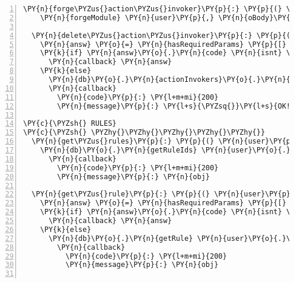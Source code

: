 \begin{Verbatim}[fontsize=\scriptsize,commandchars=\\\{\},numbers=left,firstnumber=1,stepnumber=1]
  \PY{n}{forge\PYZus{}action\PYZus{}invoker}\PY{p}{:} \PY{p}{(} \PY{n}{user}\PY{p}{,} \PY{n}{oBody}\PY{p}{,} \PY{n}{callback} \PY{p}{)} \PY{o}{\PYZhy{}}\PY{o}{\PYZgt{}}
    \PY{n}{forgeModule} \PY{n}{user}\PY{p}{,} \PY{n}{oBody}\PY{p}{,} \PY{l+s}{\PYZdq{}}\PY{l+s}{actioninvoker}\PY{l+s}{\PYZdq{}}\PY{p}{,} \PY{n}{db}\PY{o}{.}\PY{n}{actionInvokers}\PY{p}{,} \PY{n}{callback}

  \PY{n}{delete\PYZus{}action\PYZus{}invoker}\PY{p}{:} \PY{p}{(} \PY{n}{user}\PY{p}{,} \PY{n}{oBody}\PY{p}{,} \PY{n}{callback} \PY{p}{)} \PY{o}{\PYZhy{}}\PY{o}{\PYZgt{}}
    \PY{n}{answ} \PY{o}{=} \PY{n}{hasRequiredParams} \PY{p}{[} \PY{l+s}{\PYZsq{}}\PY{l+s}{id}\PY{l+s}{\PYZsq{}} \PY{p}{]}\PY{p}{,} \PY{n}{oBody}
    \PY{k}{if} \PY{n}{answ}\PY{o}{.}\PY{n}{code} \PY{n}{isnt} \PY{l+m+mi}{200}
      \PY{n}{callback} \PY{n}{answ}
    \PY{k}{else}
      \PY{n}{db}\PY{o}{.}\PY{n}{actionInvokers}\PY{o}{.}\PY{n}{deleteModule} \PY{n}{user}\PY{o}{.}\PY{n}{username}\PY{p}{,} \PY{n}{oBody}\PY{o}{.}\PY{n}{id}
      \PY{n}{callback}
        \PY{n}{code}\PY{p}{:} \PY{l+m+mi}{200}
        \PY{n}{message}\PY{p}{:} \PY{l+s}{\PYZsq{}}\PY{l+s}{OK!}\PY{l+s}{\PYZsq{}}

\PY{c}{\PYZsh{} RULES}
\PY{c}{\PYZsh{} \PYZhy{}\PYZhy{}\PYZhy{}\PYZhy{}\PYZhy{}}
  \PY{n}{get\PYZus{}rules}\PY{p}{:} \PY{p}{(} \PY{n}{user}\PY{p}{,} \PY{n}{oBody}\PY{p}{,} \PY{n}{callback} \PY{p}{)} \PY{o}{\PYZhy{}}\PY{o}{\PYZgt{}}
    \PY{n}{db}\PY{o}{.}\PY{n}{getRuleIds} \PY{n}{user}\PY{o}{.}\PY{n}{username}\PY{p}{,} \PY{p}{(} \PY{n}{err}\PY{p}{,} \PY{n}{obj} \PY{p}{)} \PY{o}{\PYZhy{}}\PY{o}{\PYZgt{}}
      \PY{n}{callback}
        \PY{n}{code}\PY{p}{:} \PY{l+m+mi}{200}
        \PY{n}{message}\PY{p}{:} \PY{n}{obj}

  \PY{n}{get\PYZus{}rule}\PY{p}{:} \PY{p}{(} \PY{n}{user}\PY{p}{,} \PY{n}{oBody}\PY{p}{,} \PY{n}{callback} \PY{p}{)} \PY{o}{\PYZhy{}}\PY{o}{\PYZgt{}}
    \PY{n}{answ} \PY{o}{=} \PY{n}{hasRequiredParams} \PY{p}{[} \PY{l+s}{\PYZsq{}}\PY{l+s}{id}\PY{l+s}{\PYZsq{}} \PY{p}{]}\PY{p}{,} \PY{n}{oBody}
    \PY{k}{if} \PY{n}{answ}\PY{o}{.}\PY{n}{code} \PY{n}{isnt} \PY{l+m+mi}{200}
      \PY{n}{callback} \PY{n}{answ}
    \PY{k}{else}
      \PY{n}{db}\PY{o}{.}\PY{n}{getRule} \PY{n}{user}\PY{o}{.}\PY{n}{username}\PY{p}{,} \PY{n}{oBody}\PY{o}{.}\PY{n}{id}\PY{p}{,} \PY{p}{(} \PY{n}{err}\PY{p}{,} \PY{n}{obj} \PY{p}{)} \PY{o}{\PYZhy{}}\PY{o}{\PYZgt{}}
        \PY{n}{callback}
          \PY{n}{code}\PY{p}{:} \PY{l+m+mi}{200}
          \PY{n}{message}\PY{p}{:} \PY{n}{obj}


\end{Verbatim}
